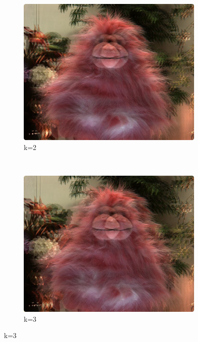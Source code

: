 \documentclass[a4paper]{article}
\begin{document}
\begin{figure}[ht]
	\vspace{2mm}
	\begin{subfigure}[h]{0.48\textwidth}
	  \includegraphics[width=\textwidth]{LinearInterpolation60_62}
	  \caption*{k=2}
	\end{subfigure}
    	~
	\begin{subfigure}[h]{0.48\textwidth}
	  \centering
	  \includegraphics[width=\textwidth]{LinearInterpolation60_63}
	  \caption*{k=3}
	\end{subfigure}
	

\end{figure}
\end{document}
